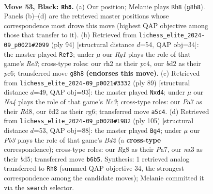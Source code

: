 \documentclass[11pt]{article}
\begin{document}
\begin{figure}[p]\centering
\begin{subfigure}{0.46\textwidth}\centering
\resizebox{\linewidth}{!}{%
\newchessgame
\chessboard[
  setfen={6r1/p7/1pr1p1kp/n7/2P1P3/N7/P2BK1PR/2R5 b - - 0 53},
  showmover=false,
  pgfstyle=straightmove, color=movearrow, markmove={g8-h8}
]}
\caption{}
\end{subfigure}\hfill
\begin{subfigure}{0.46\textwidth}\centering
\resizebox{\linewidth}{!}{%
\newchessgame
\chessboard[
  setfen={4rr2/p5pk/2p1b2p/4PP2/2p5/2N1R3/PP1K4/5R2 w - - 9 48},
  showmover=false,
  pgfstyle=straightmove, color=movearrow, markmove={e3-f3}
]}
\caption{}
\end{subfigure}
\\[4pt]
\begin{subfigure}{0.46\textwidth}\centering
\resizebox{\linewidth}{!}{%
\newchessgame
\chessboard[
  setfen={3r4/1k1r4/1pn3R1/p5p1/P2P1p2/6PP/1P4K1/3R2B1 b - - 1 45},
  showmover=false,
  pgfstyle=straightmove, color=movearrow, markmove={c6-d4}
]}
\caption{}
\end{subfigure}\hfill
\begin{subfigure}{0.46\textwidth}\centering
\resizebox{\linewidth}{!}{%
\newchessgame
\chessboard[
  setfen={5r2/p2br1k1/1p4p1/2nB3p/3RP2P/P3K1N1/2R3P1/8 b - - 44 53},
  showmover=false,
  pgfstyle=straightmove, color=movearrow, markmove={d7-g4}
]}
\caption{}
\end{subfigure}
\caption{\textbf{Move 53, Black: \texttt{Rh8}.} (a) Our position; Melanie plays \texttt{Rh8} (\texttt{g8h8}). Panels (b)--(d) are the retrieved master positions whose correspondence most drove this move (highest QAP objective among those that transfer to it). (b) Retrieved from \texttt{lichess\_elite\_2024-09\_p0021\#2099} (ply 94) [structural distance $d$=54, QAP obj=34]: the master played \texttt{Ref3}; under $\mu$ our \emph{Rg1} plays the role of that game's \emph{Re3}; cross-type roles: our \emph{r}h2 as their \emph{p}c4, our \emph{b}d2 as their \emph{p}c6; transferred move \texttt{g8h8} \textbf{(endorses this move)}. (c) Retrieved from \texttt{lichess\_elite\_2024-09\_p0021\#3332} (ply 89) [structural distance $d$=49, QAP obj=93]: the master played \texttt{Nxd4}; under $\mu$ our \emph{Na4} plays the role of that game's \emph{Nc3}; cross-type roles: our \emph{P}a7 as their \emph{R}d8, our \emph{b}d2 as their \emph{r}g6; transferred move \texttt{a5c4}. (d) Retrieved from \texttt{lichess\_elite\_2024-09\_p0028\#1982} (ply 105) [structural distance $d$=53, QAP obj=88]: the master played \texttt{Bg4}; under $\mu$ our \emph{Pb3} plays the role of that game's \emph{Bd2} (a \textbf{cross-type} correspondence); cross-type roles: our \emph{R}g8 as their \emph{P}a7, our \emph{n}a3 as their \emph{b}d5; transferred move \texttt{b6b5}. Synthesis: 1 retrieved analog transferred to \texttt{Rh8} (summed QAP objective 34, the strongest correspondence among the candidate moves); Melanie committed it via the \texttt{search} selector.}
\label{fig:thought-m105}
\end{figure}
\end{document}
